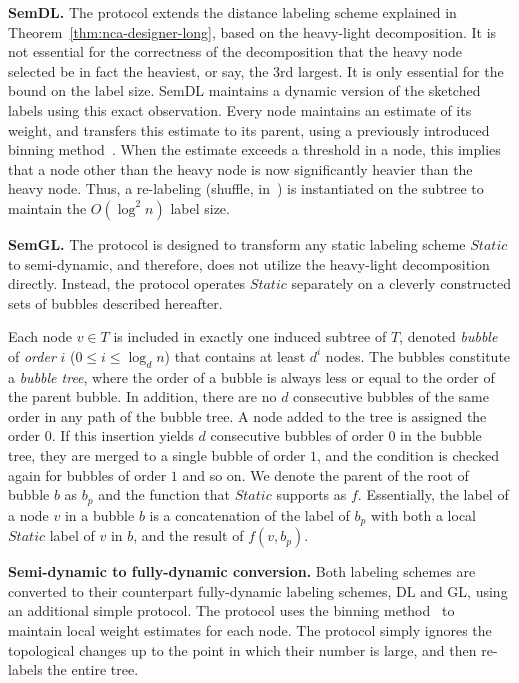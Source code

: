 \textbf{SemDL.}
The protocol extends the distance labeling scheme explained in Theorem~\ref{thm:nca-designer-long}, based on the heavy-light decomposition.
 It is not essential for the correctness of the decomposition that the heavy node selected be in fact the heaviest, or say, the 3rd largest. It is only essential for the bound on the label size.
SemDL maintains a dynamic version of the sketched labels using this exact observation. Every node maintains an estimate of its weight, and transfers this estimate to its parent, using a previously introduced binning method~\cite{afek1996local}.
When the estimate exceeds a threshold in a node, this implies that a node other than the heavy node is now significantly heavier than the heavy node. Thus, a  re-labeling (shuffle, in~\cite{korman2004labeling}) is instantiated on the subtree to maintain the $O(\log^2 n)$ label size.

\textbf{SemGL.} The protocol is designed to transform any static labeling scheme $Static$ to semi-dynamic, and therefore, does not utilize the heavy-light decomposition directly.
Instead, the protocol operates $Static$  separately on a cleverly constructed sets of bubbles described hereafter.

Each node $v \in T$ is included in exactly one induced subtree of $T$, denoted  \emph{bubble} of \emph{order} $i$ ($0 \leq i \leq \log_d n$) that  contains at least   $d^i$  nodes. 
The bubbles constitute a  \emph{bubble tree}, where the order of  a bubble is always less or equal to the order of the parent bubble. 
 In addition, there are no $d$ consecutive bubbles of the same order in any path of the bubble tree. 
A node added to the tree is assigned the order $0$. If this insertion yields $d$ consecutive bubbles of order $0$ in the bubble tree, they are merged to a single  bubble of order $1$, and the condition is checked again for bubbles of order $1$ and so on. We denote the parent of the root of  bubble $b$ as $b_p$ and the function that $Static$ supports as $f$.
 Essentially, the label of a node $v$ in a bubble $b$ is a concatenation of the label of $b_p$ with both   a local $Static$ label of $v$ in $b$, and the result of $f(v,b_p)$.  
 
\textbf{Semi-dynamic to fully-dynamic conversion.} Both labeling schemes are converted to their counterpart fully-dynamic labeling schemes, DL and GL, using an additional simple protocol.
The protocol uses the binning method~\cite{afek1996local} to maintain local weight estimates for each node.
The protocol simply ignores the topological changes up to the point in which their number is large, and then re-labels the entire tree.


